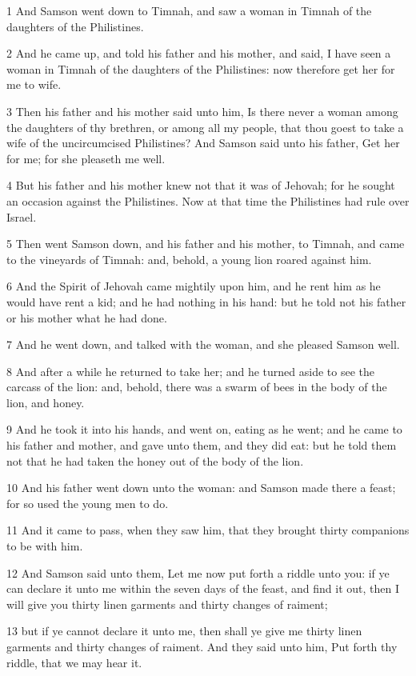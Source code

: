\par 1 And Samson went down to Timnah, and saw a woman in Timnah of the daughters of the Philistines.
\par 2 And he came up, and told his father and his mother, and said, I have seen a woman in Timnah of the daughters of the Philistines: now therefore get her for me to wife.
\par 3 Then his father and his mother said unto him, Is there never a woman among the daughters of thy brethren, or among all my people, that thou goest to take a wife of the uncircumcised Philistines? And Samson said unto his father, Get her for me; for she pleaseth me well.
\par 4 But his father and his mother knew not that it was of Jehovah; for he sought an occasion against the Philistines. Now at that time the Philistines had rule over Israel.
\par 5 Then went Samson down, and his father and his mother, to Timnah, and came to the vineyards of Timnah: and, behold, a young lion roared against him.
\par 6 And the Spirit of Jehovah came mightily upon him, and he rent him as he would have rent a kid; and he had nothing in his hand: but he told not his father or his mother what he had done.
\par 7 And he went down, and talked with the woman, and she pleased Samson well.
\par 8 And after a while he returned to take her; and he turned aside to see the carcass of the lion: and, behold, there was a swarm of bees in the body of the lion, and honey.
\par 9 And he took it into his hands, and went on, eating as he went; and he came to his father and mother, and gave unto them, and they did eat: but he told them not that he had taken the honey out of the body of the lion.
\par 10 And his father went down unto the woman: and Samson made there a feast; for so used the young men to do.
\par 11 And it came to pass, when they saw him, that they brought thirty companions to be with him.
\par 12 And Samson said unto them, Let me now put forth a riddle unto you: if ye can declare it unto me within the seven days of the feast, and find it out, then I will give you thirty linen garments and thirty changes of raiment;
\par 13 but if ye cannot declare it unto me, then shall ye give me thirty linen garments and thirty changes of raiment. And they said unto him, Put forth thy riddle, that we may hear it.
